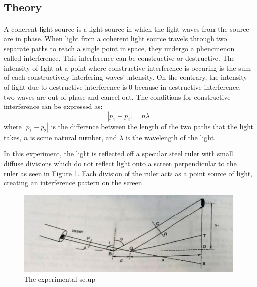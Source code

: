\documentclass{article}
\begin{document}
\subsection{Theory}
\paragraph{}
A coherent light source is a light source in which the light waves from the source are in phase. When light from a coherent light source travels through two separate paths to reach a single point in space, they undergo a phenomenon called interference. This interference can be constructive or destructive. The intensity of light at a point where constructive interference is occuring is the sum of each constructively interfering waves' intensity. On the contrary, the intensity of light due to destructive interference is 0 because in destructive interference, two waves are out of phase and cancel out. The conditions for constructive interference can be expressed as:
\begin{equation}\label{eq:constructive}
  |p_1 - p_2| = n \lambda
\end{equation}
where $|p_1 - p_2|$ is the difference between the length of the two paths that the light takes, $n$ is some natural number, and $\lambda$ is the wavelength of the light.

In this experiment, the light is reflected off a specular steel ruler with small diffuse divisions which do not reflect light onto a screen perpendicular to the ruler as seen in Figure \ref{fig:setup}. Each division of the ruler acts as a point source of light, creating an interference pattern on the screen.
\begin{figure}[H]
  \includegraphics[width=\textwidth]{img/setup.pdf}
  \caption{The experimental setup \autocite{UPCSE2018}}
  \label{fig:setup}
\end{figure}
\end{document}
